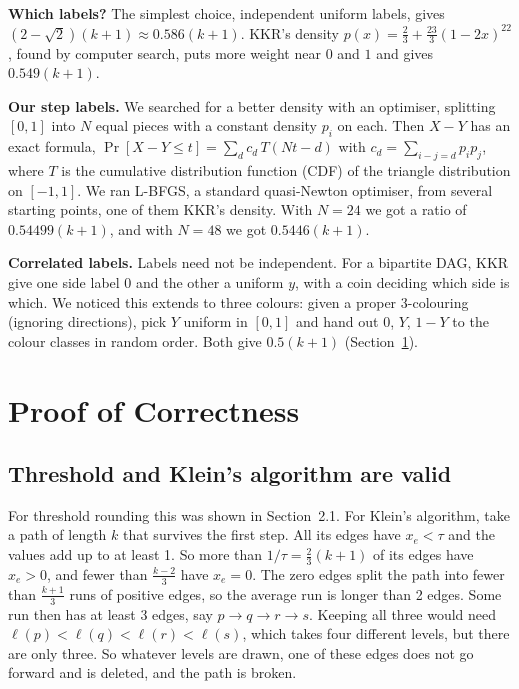 \documentclass[sigconf,nonacm]{acmart}
\begin{document}
\textbf{Which labels?} The simplest choice, independent uniform labels, gives $(2-\sqrt2)(k+1)\approx0.586(k+1)$. KKR's density $p(x)=\frac23+\frac{23}3(1-2x)^{22}$, found by computer search, puts more weight near $0$ and $1$ and gives $0.549(k+1)$.

\textbf{Our step labels.} We searched for a better density with an optimiser, splitting $[0,1]$ into $N$ equal pieces with a constant density $p_i$ on each. Then $X-Y$ has an exact formula, $\Pr[X-Y\le t]=\sum_dc_d\,T(Nt-d)$ with $c_d=\sum_{i-j=d}p_ip_j$, where $T$ is the cumulative distribution function (CDF) of the triangle distribution on $[-1,1]$. We ran L-BFGS, a standard quasi-Newton optimiser, from several starting points, one of them KKR's density. With $N=24$ we got a ratio of $0.54499(k+1)$, and with $N=48$ we got $0.5446(k+1)$.

 \textbf{Correlated labels.} Labels need not be independent. For a bipartite DAG, KKR give one side label $0$ and the other a uniform $y$, with a coin deciding which side is which. We noticed this extends to three colours: given a proper 3-colouring (ignoring directions), pick $Y$ uniform in $[0,1]$ and hand out $0$, $Y$, $1-Y$ to the colour classes in random order. Both give $0.5(k+1)$ (Section~\ref{sec:proofs}).

\section{Proof of Correctness}\label{sec:proofs}

\subsection{Threshold and Klein's algorithm are valid}
 For threshold rounding this was shown in Section~2.1. For Klein's algorithm, take a path of length $k$ that survives the first step. All its edges have $x_e<\tau$ and the values add up to at least 1. So more than $1/\tau=\frac23(k+1)$ of its edges have $x_e>0$, and fewer than $\frac{k-2}3$ have $x_e=0$. The zero edges split the path into fewer than $\frac{k+1}3$ runs of positive edges, so the average run is longer than 2 edges. Some run then has at least 3 edges, say $p\to q\to r\to s$. Keeping all three would need $\ell(p)<\ell(q)<\ell(r)<\ell(s)$, which takes four different levels, but there are only three. So whatever levels are drawn, one of these edges does not go forward and is deleted, and the path is broken.
\end{document}
